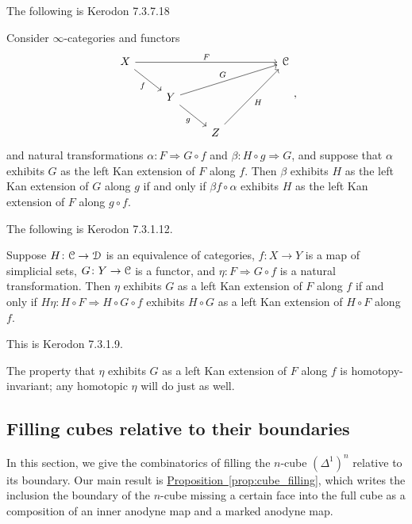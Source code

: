 \documentclass[main.tex]{subfiles}
\begin{document}
The following is Kerodon 7.3.7.18
\begin{proposition}
  \label{prop:kan_extend_along_composition}
  Consider $\infty$-categories and functors
  \begin{equation*}
    \begin{tikzcd}
      X
      \arrow[dr, swap, "f"]
      \arrow[rrrr, "F"]
      &&&& \category{C}
      \\
      & Y
      \arrow[urrr, "G"]
      \arrow[dr, swap, "g"]
      \\
      && Z
      \arrow[uurr, swap, "H"]
    \end{tikzcd},
  \end{equation*}
  and natural transformations $\alpha\colon F \Rightarrow G \circ f$ and $\beta\colon H \circ g \Rightarrow G$, and suppose that $\alpha$ exhibits $G$ as the left Kan extension of $F$ along $f$. Then $\beta$ exhibits $H$ as the left Kan extension of $G$ along $g$ if and only if $\beta f \circ \alpha$ exhibits $H$ as the left Kan extension of $F$ along $g \circ f$.
\end{proposition}

The following is Kerodon 7.3.1.12.
\begin{proposition}
  \label{prop:kan_ext_invariance_of_target}
  Suppose $H\colon \mathcal{C} \to \mathcal{D}$ is an equivalence of categories, $f\colon X \to Y$ is a map of simplicial sets, $G\colon Y \to \mathcal{C}$ is a functor, and $\eta\colon F \Rightarrow G \circ f$ is a natural transformation. Then $\eta$ exhibits $G$ as a left Kan extension of $F$ along $f$ if and only if $H\eta\colon H \circ F \Rightarrow H \circ G \circ f$ exhibits $H \circ G$ as a left Kan extension of $H \circ F$ along $f$.
\end{proposition}

This is Kerodon 7.3.1.9.
\begin{proposition}
  \label{prop:homotopy_invariance_of_witness}
  The property that $\eta$ exhibits $G$ as a left Kan extension of $F$ along $f$ is homotopy-invariant; any homotopic $\eta$ will do just as well.
\end{proposition}

\subsection{Filling cubes relative to their boundaries}
\label{ssc:filling_cubes_relative_to_their_boundary}

In this section, we give the combinatorics of filling the $n$-cube $(\Delta^{1})^{n}$ relative to its boundary. Our main result is \hyperref[prop:cube_filling]{Proposition~\ref*{prop:cube_filling}}, which writes the inclusion the boundary of the $n$-cube missing a certain face into the full cube as a composition of an inner anodyne map and a marked anodyne map.
\end{document}
